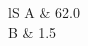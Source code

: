 \documentclass{article}
\begin{document}
\begin{tabular}{lS}
A & \num{62.0} \\
B & 1.5 \\
\end{tabular}
\end{document}
